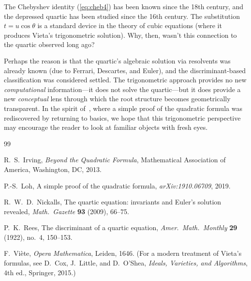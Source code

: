 \documentclass[12pt]{article}
\theoremstyle{definition}
\theoremstyle{remark}
\begin{document}
The Chebyshev identity (\ref{eq:cheb4}) has been known since the 18th century, and the depressed quartic has been studied since the 16th century. The substitution $t = u\cos\theta$ is a standard device in the theory of cubic equations (where it produces Vieta's trigonometric solution). Why, then, wasn't this connection to the quartic observed long ago?

Perhaps the reason is that the quartic's algebraic solution via resolvents was already known (due to Ferrari, Descartes, and Euler), and the discriminant-based classification was considered settled. The trigonometric approach provides no new \emph{computational} information---it does not solve the quartic---but it does provide a new \emph{conceptual} lens through which the root structure becomes geometrically transparent. In the spirit of~\cite{Loh2019}, where a simple proof of the quadratic formula was rediscovered by returning to basics, we hope that this trigonometric perspective may encourage the reader to look at familiar objects with fresh eyes.

\begin{thebibliography}{99}

R.~S.~Irving,
\emph{Beyond the Quadratic Formula},
Mathematical Association of America, Washington, DC, 2013.

P.-S.~Loh,
A simple proof of the quadratic formula,
\emph{arXiv:1910.06709}, 2019.

R.~W.~D.~Nickalls,
The quartic equation: invariants and Euler's solution revealed,
\emph{Math.\ Gazette} \textbf{93} (2009), 66--75.

P.~K.~Rees,
The discriminant of a quartic equation,
\emph{Amer.\ Math.\ Monthly} \textbf{29} (1922), no.~4, 150--153.

F.~Vi\`ete,
\emph{Opera Mathematica},
Leiden, 1646.
(For a modern treatment of Vieta's formulas, see D.~Cox, J.~Little, and D.~O'Shea,
\emph{Ideals, Varieties, and Algorithms}, 4th ed., Springer, 2015.)

\end{thebibliography}
\end{document}
